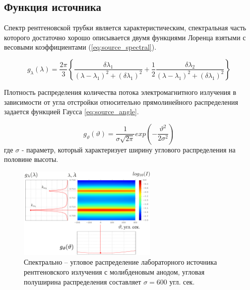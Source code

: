 \subsection{Функция источника}
\label{sec:source_section}
Спектр рентгеновской трубки является характеристическим, спектральная часть
 которого достаточно хорошо описывается двумя функциями Лоренца взятыми с
 весовыми коэффициентами (\ref{eq:source_spectral}).

 \begin{equation} \label{eq:source_spectral}
   g_{\lambda} (\lambda) = \frac{2\pi}{3}  \left \{ \frac{\delta\lambda_1}{(\lambda - \lambda_1)^2+
   (\delta \lambda_1)^2} + \frac{1}{2} \frac{\delta\lambda_2}{(\lambda-\lambda_1)^2+(\delta\lambda_1)^2} \right \}
  \end{equation}

  Плотность распределения количества потока электромагнитного излучения в зависимости от угла
  отстройки относительно прямолинейного распределения задается функцией Гаусса \ref{eq:source_angle}.

  \begin{equation} \label{eq:source_angle}
    g_{\vartheta} (\vartheta) = \frac{1}{\sigma \sqrt{ 2\pi}} exp  ( -\frac{\vartheta^2}{2\sigma^2} )
   \end{equation}
где $\sigma$ - параметр, который характеризует ширину углового распределения на половине высоты.

\begin{figure}[H]
  \centering
  \includegraphics[width=0.6\textwidth]{images/source_distrubition.png}
  \caption{Спектрально – угловое распределение лабораторного источника рентгеновского
   излучения с молибденовым анодом, угловая полуширина распределения составляет $\sigma = 600$ угл. сек. }
  \label{ris:source_distrubition}
\end{figure}



